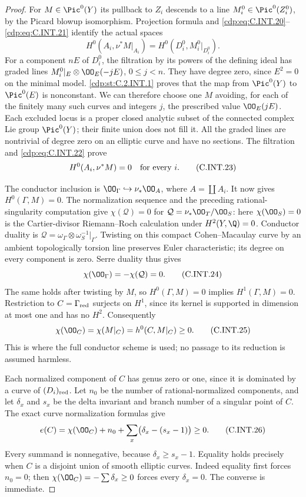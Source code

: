 \begin{proof}
For $M\in\Pic^0(Y)$ its pullback to $Z_i$ descends
to a line $M_i^0\in\Pic^0(Z_i^0)$, by the Picard
blowup isomorphism. Projection formula and
\eqref{cdp:eq:C.INT.20}--\eqref{cdp:eq:C.INT.21} identify the actual spaces
\[
 H^0(A_i,\nu^*M|_{A_i})
   =H^0(D_i^0,M_i^0|_{D_i^0}).
 \tag{C.INT.22}\label{cdp:eq:C.INT.22}
\]
For a component $nE$ of $D_i^0$, the filtration by
its powers of the defining ideal has graded lines
$M_i^0|_E\otimes\OO_E(-jE)$, $0\le j<n$.
They have degree zero, since $E^2=0$ on the
minimal model. \ref{cdp:st:C.2.INT.1} proves that the map from
$\Pic^0(Y)$ to $\Pic^0(E)$ is nonconstant. We can
therefore choose one $M$ avoiding, for each of
the finitely many such curves and integers $j$,
the prescribed value $\OO_E(jE)$.
Each excluded locus is a proper closed analytic
subset of the connected complex Lie group
$\Pic^0(Y)$; their finite union does not fill it.
All the graded lines are nontrivial of degree
zero on an elliptic curve and have no sections.
The filtration and \eqref{cdp:eq:C.INT.22} prove
\[
 H^0(A_i,\nu^*M)=0\quad\hbox{for every }i.
 \tag{C.INT.23}\label{cdp:eq:C.INT.23}
\]

The conductor inclusion is
$\OO_\Gamma\hookrightarrow\nu_*\OO_A$, where
$A=\coprod A_i$. It now gives $H^0(\Gamma,M)=0$.
The normalization sequence and the preceding
rational-singularity computation give
$\chi(\mathcal Q)=0$ for
$\mathcal Q=\nu_*\OO_T/\OO_S$: here
$\chi(\OO_S)=0$ is the Cartier-divisor
Riemann--Roch calculation under $H^2(Y,\Q)=0$.
Conductor duality is
$\mathcal Q=\omega_\Gamma\otimes\omega_S^{-1}|_\Gamma$.
Twisting on this compact Cohen--Macaulay curve by
an ambient topologically torsion line preserves
Euler characteristic; its degree on every
component is zero. Serre duality thus gives
\[
 \chi(\OO_\Gamma)=-\chi(\mathcal Q)=0.
 \tag{C.INT.24}\label{cdp:eq:C.INT.24}
\]
The same holds after twisting by $M$, so
$H^0(\Gamma,M)=0$ implies $H^1(\Gamma,M)=0$.
Restriction to $C=\Gamma_{\rm red}$ surjects
on $H^1$, since its kernel is supported in
dimension at most one and has no $H^2$.
Consequently
\[
 \chi(\OO_C)=\chi(M|_C)=h^0(C,M|_C)\ge0.
 \tag{C.INT.25}\label{cdp:eq:C.INT.25}
\]
This is where the full conductor scheme is used;
no passage to its reduction is assumed harmless.

Each normalized component of $C$ has genus zero
or one, since it is dominated by a curve of
$(D_i)_{\rm red}$. Let $n_0$ be the number of
rational-normalized components, and let
$\delta_x$ and $s_x$ be the delta invariant and
branch number of a singular point of $C$.
The exact curve normalization formulas give
\[
 e(C)=\chi(\OO_C)+n_0+
                \sum_x\bigl(\delta_x-(s_x-1)\bigr)\ge0.
 \tag{C.INT.26}\label{cdp:eq:C.INT.26}
\]
Every summand is nonnegative, because
$\delta_x\ge s_x-1$. Equality holds precisely
when $C$ is a disjoint union of smooth elliptic
curves. Indeed equality first forces $n_0=0$;
then $\chi(\OO_C)=-\sum\delta_x\ge0$
forces every $\delta_x=0$. The converse is immediate.


\end{proof}
